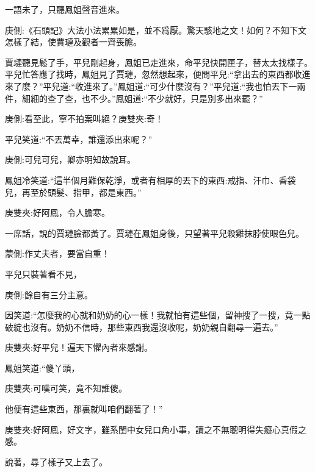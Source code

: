 \begin{parag}
    一語未了，只聽鳳姐聲音進來。\begin{note}庚側:《石頭記》大法小法累累如是，並不爲厭。驚天駭地之文！如何？不知下文怎樣了結，使賈璉及觀者一齊喪膽。\end{note}賈璉聽見鬆了手，平兒剛起身，鳳姐已走進來，命平兒快開匣子，替太太找樣子。平兒忙答應了找時，鳳姐見了賈璉，忽然想起來，便問平兒:“拿出去的東西都收進來了麼？”平兒道:“收進來了。”鳳姐道:“可少什麼沒有？”平兒道:“我也怕丟下一兩件，細細的查了查，也不少。”鳳姐道:“不少就好，只是別多出來罷？”\begin{note}庚側:看至此，寧不拍案叫絕？庚雙夾:奇！\end{note}平兒笑道:“不丟萬幸，誰還添出來呢？”\begin{note}庚側:可兒可兒，卿亦明知故說耳。\end{note}鳳姐冷笑道:“這半個月難保乾淨，或者有相厚的丟下的東西:戒指、汗巾、香袋兒，再至於頭髮、指甲，都是東西。”\begin{note}庚雙夾:好阿鳳，令人膽寒。\end{note}一席話，說的賈璉臉都黃了。賈璉在鳳姐身後，只望著平兒殺雞抹脖使眼色兒。\begin{note}蒙側:作丈夫者，要當自重！\end{note}平兒只裝著看不見，\begin{note}庚側:餘自有三分主意。\end{note}因笑道:“怎麼我的心就和奶奶的心一樣！我就怕有這些個，留神搜了一搜，竟一點破綻也沒有。奶奶不信時，那些東西我還沒收呢，奶奶親自翻尋一遍去。”\begin{note}庚雙夾:好平兒！遍天下懼內者來感謝。\end{note}鳳姐笑道:“傻丫頭，\begin{note}庚雙夾:可嘆可笑，竟不知誰傻。\end{note}他便有這些東西，那裏就叫咱們翻著了！”\begin{note}庚雙夾:好阿鳳，好文字，雖系閨中女兒口角小事，讀之不無聰明得失癡心真假之感。\end{note}說著，尋了樣子又上去了。
\end{parag}


